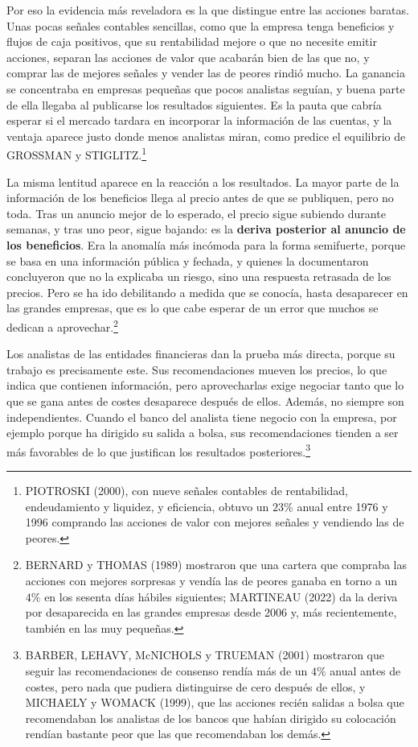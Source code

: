\documentclass[10pt,a4paper]{article}
\begin{document}
Por eso la evidencia más reveladora es la que distingue entre las acciones baratas. Unas pocas señales contables sencillas, como que la empresa tenga beneficios y flujos de caja positivos, que su rentabilidad mejore o que no necesite emitir acciones, separan las acciones de valor que acabarán bien de las que no, y comprar las de mejores señales y vender las de peores rindió mucho. La ganancia se concentraba en empresas pequeñas que pocos analistas seguían, y buena parte de ella llegaba al publicarse los resultados siguientes. Es la pauta que cabría esperar si el mercado tardara en incorporar la información de las cuentas, y la ventaja aparece justo donde menos analistas miran, como predice el equilibrio de GROSSMAN y STIGLITZ.\footnote{%
    PIOTROSKI (2000), con nueve señales contables de rentabilidad, endeudamiento y liquidez, y eficiencia, obtuvo un $23\%$ anual entre 1976 y 1996 comprando las acciones de valor con mejores señales y vendiendo las de peores.
}

La misma lentitud aparece en la reacción a los resultados. La mayor parte de la información de los beneficios llega al precio antes de que se publiquen, pero no toda. Tras un anuncio mejor de lo esperado, el precio sigue subiendo durante semanas, y tras uno peor, sigue bajando: es la \textbf{deriva posterior al anuncio de los beneficios}. Era la anomalía más incómoda para la forma semifuerte, porque se basa en una información pública y fechada, y quienes la documentaron concluyeron que no la explicaba un riesgo, sino una respuesta retrasada de los precios. Pero se ha ido debilitando a medida que se conocía, hasta desaparecer en las grandes empresas, que es lo que cabe esperar de un error que muchos se dedican a aprovechar.\footnote{%
    BERNARD y THOMAS (1989) mostraron que una cartera que compraba las acciones con mejores sorpresas y vendía las de peores ganaba en torno a un $4\%$ en los sesenta días hábiles siguientes; MARTINEAU (2022) da la deriva por desaparecida en las grandes empresas desde 2006 y, más recientemente, también en las muy pequeñas.
}

Los analistas de las entidades financieras dan la prueba más directa, porque su trabajo es precisamente este. Sus recomendaciones mueven los precios, lo que indica que contienen información, pero aprovecharlas exige negociar tanto que lo que se gana antes de costes desaparece después de ellos. Además, no siempre son independientes. Cuando el banco del analista tiene negocio con la empresa, por ejemplo porque ha dirigido su salida a bolsa, sus recomendaciones tienden a ser más favorables de lo que justifican los resultados posteriores.\footnote{%
    BARBER, LEHAVY, McNICHOLS y TRUEMAN (2001) mostraron que seguir las recomendaciones de consenso rendía más de un $4\%$ anual antes de costes, pero nada que pudiera distinguirse de cero después de ellos, y MICHAELY y WOMACK (1999), que las acciones recién salidas a bolsa que recomendaban los analistas de los bancos que habían dirigido su colocación rendían bastante peor que las que recomendaban los demás.
}
\end{document}
